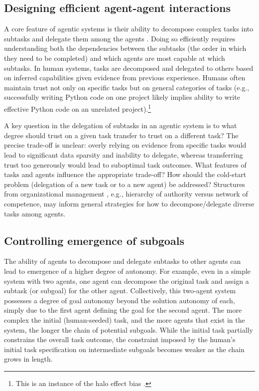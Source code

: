 \documentclass{article}
\theoremstyle{plain}
\theoremstyle{definition}
\theoremstyle{remark}
\begin{document}
\subsection{Designing efficient agent-agent interactions}

A core feature of agentic systems is their ability to decompose complex tasks into subtasks and delegate them among the agents \cite{zhu2024redel}. Doing so efficiently requires understanding both the dependencies between the subtasks (the order in which they need to be completed) and which agents are most capable at which subtasks. In human systems, tasks are decomposed and delegated to others based on inferred capabilities given evidence from previous experience. Humans often maintain trust not only on specific tasks but on general categories of tasks (e.g., successfully writing Python code on one project likely implies ability to write effective Python code on an unrelated project).\footnote{This is an instance of the halo effect bias \cite{thorndike1920}.} 


A key question in the delegation of subtasks in an agentic system is to what degree should trust on a given task transfer to trust on a different task? The precise trade-off is unclear: overly relying on evidence from specific tasks would lead to significant data sparsity and inability to delegate, whereas transferring trust too generously would lead to suboptimal task outcomes. What features of tasks and agents influence the appropriate trade-off? How should the cold-start problem (delegation of a new task or to a new agent) be addressed? Structures from organizational management \cite{lai2017systems,denning2022digital}, e.g., hierarchy of authority versus network of competence, may inform general strategies for how to decompose/delegate diverse tasks among agents. 


\subsection{Controlling emergence of subgoals}  %



The ability of agents to decompose and delegate subtasks to other agents can lead to emergence of a higher degree of autonomy. For example, even in a simple system with two agents, one agent can decompose the original task and assign a subtask (or subgoal) for the other agent. Collectively, this two-agent system possesses a degree of goal autonomy beyond the solution autonomy of each, simply due to the first agent defining the goal for the second agent. The more complex the initial (human-seeded) task, and the more agents that exist in the system, the longer the chain of potential subgoals. While the initial task partially constrains the overall task outcome, the constraint imposed by the human's initial task specification on intermediate subgoals becomes weaker as the chain grows in length.
\end{document}
